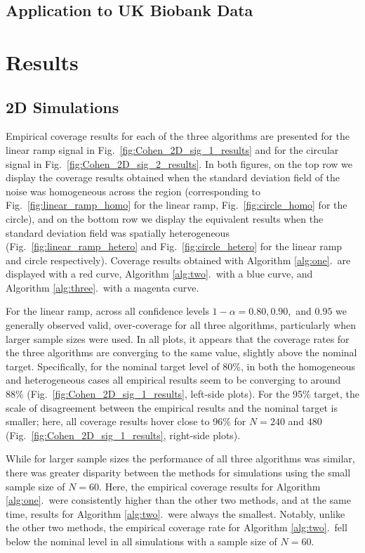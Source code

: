 \subsection{Application to UK Biobank Data}

\section{Results}
\label{sec:simulation_results}
\subsection{2D Simulations} 
\label{sec:2D_sim_results}

Empirical coverage results for each of the three algorithms are presented for the linear ramp signal in Fig.\ \ref{fig:Cohen_2D_sig_1_results} and for the circular signal in Fig.\ \ref{fig:Cohen_2D_sig_2_results}. In both figures, on the top row we display the coverage results obtained when the standard deviation field of the noise was homogeneous across the region (corresponding to Fig.\ \ref{fig:linear_ramp_homo} for the linear ramp, Fig.\ \ref{fig:circle_homo} for the circle), and on the bottom row we display the equivalent results when the standard deviation field was spatially heterogeneous (Fig.\ \ref{fig:linear_ramp_hetero} and Fig.\ \ref{fig:circle_hetero} for the linear ramp and circle respectively). Coverage results obtained with Algorithm \ref{alg:one}.\ are displayed with a red curve, Algorithm \ref{alg:two}.\ with a blue curve, and Algorithm \ref{alg:three}.\ with a magenta curve.

For the linear ramp, across all confidence levels $1 - \alpha = 0.80, 0.90,$ and $0.95$ we generally observed valid, over-coverage for all three algorithms, particularly when larger sample sizes were used. In all plots, it appears that the coverage rates for the three algorithms are converging to the same value, slightly above the nominal target. Specifically, for the nominal target level of 80\%, in both the homogeneous and heterogeneous cases all empirical results seem to be converging to around 88\% (Fig.\ \ref{fig:Cohen_2D_sig_1_results}, left-side plots). For the 95\% target, the scale of disagreement between the empirical results and the nominal target is smaller; here, all coverage results hover close to 96\% for $N = 240$ and $480$ (Fig.\ \ref{fig:Cohen_2D_sig_1_results}, right-side plots).

While for larger sample sizes the performance of all three algorithms was similar, there was greater disparity between the methods for simulations using the small sample size of $N = 60$. Here, the empirical coverage results for Algorithm \ref{alg:one}.\ were consistently higher than the other two methods, and at the same time, results for Algorithm \ref{alg:two}.\ were always the smallest. Notably, unlike the other two methods, the empirical coverage rate for Algorithm \ref{alg:two}.\ fell below the nominal level in all simulations with a sample size of $N = 60$. 

